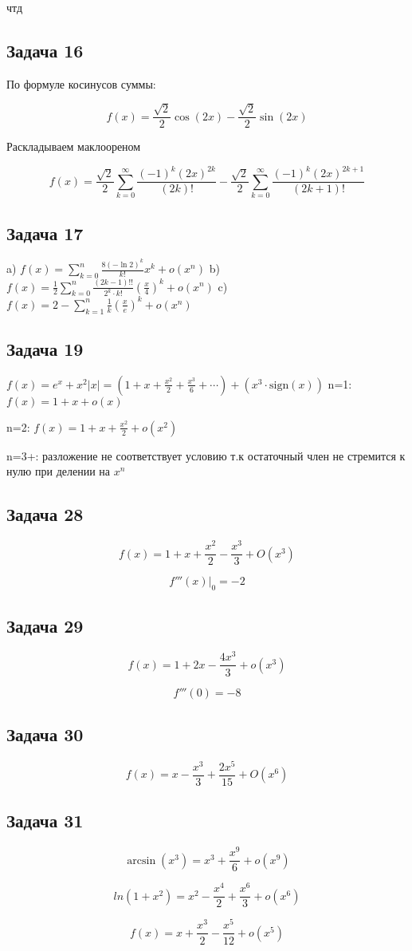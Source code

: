 \documentclass[a4paper,12pt]{article}
\begin{document}
чтд

\subsection{Задача 16}

По формуле косинусов суммы:

\[
f(x) = \frac{\sqrt{2}}{2}\cos(2x) - \frac{\sqrt{2}}{2}\sin(2x)   
\]

Раскладываем маклоореном

\[
f(x) = \frac{\sqrt{2}}{2} \sum_{k=0}^{\infty} \frac{(-1)^k (2x)^{2k}}{(2k)!} - \frac{\sqrt{2}}{2} \sum_{k=0}^{\infty} \frac{(-1)^k (2x)^{2k+1}}{(2k+1)!}
\]

\subsection{Задача 17}

a) $ f(x) = \sum_{k=0}^n \frac{8(-\ln 2)^k}{k!} x^k + o(x^n) $
b) $ f(x) = \frac{1}{2} \sum_{k=0}^n \frac{(2k-1)!!}{2^k \cdot k!} \left(\frac{x}{4}\right)^k + o(x^n) $
c) $ f(x) = 2 - \sum_{k=1}^n \frac{1}{k} \left(\frac{x}{e}\right)^k + o(x^n) $


\subsection{Задача 19}

$f(x) = e^{x} + x^{2} |x| = \left(1 + x + \frac{x^{2}}{2} + \frac{x^{3}}{6} + \cdots \right) + \left(x^{3} \cdot \text{sign}(x)\right)$
n=1: $f(x) = 1 + x + o(x)$

n=2: $f(x) = 1 + x + \frac{x^2}{2} + o(x^2)$

n=3+: разложение не соответствует условию т.к остаточный член не стремится к нулю при делении на $x^n$

\subsection{Задача 28}
\[
f(x) = 1 + x + \frac{x^2}{2}-\frac{x^3}{3} + O(x^3)
\]

\[
f'''(x)|_{0} =  -2
\]

\subsection{Задача 29}

\[
f(x) = 1 + 2x - \frac{4x^3}{3} + o(x^3)
\]

\[
f'''(0) = -8
\]

\subsection{Задача 30}
\[
f(x) = x - \frac{x^3}{3} + \frac{2x^5}{15} + O(x^6)
\]

\subsection{Задача 31}

\[
\arcsin(x^3) = x^3+\frac{x^9}{6} + o(x^9)
\]

\[
ln(1+x^2) = x^2-\frac{x^4}{2} + \frac{x^6}{3} + o(x^6)
\]

\[
f(x) = x + \frac{x^3}{2} - \frac{x^5}{12} + o(x^5)
\]
\end{document}
